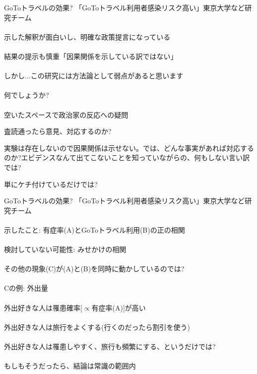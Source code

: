\begin{frame}[t]{GoToトラベルの効果?}
「GoToトラベル利用者感染リスク高い」東京大学など研究チーム\\~\\
示した解釈が面白いし、明確な政策提言になっている\\~\\
結果の提示も慎重「因果関係を示している訳ではない」\\~\\
\pause
しかし...\pause この研究には方法論として弱点があると思います\\~\\
\pause
何でしょうか?\\~\\

\pause
空いたスペースで政治家の反応への疑問
\begin{dinglist}{43}
\vspace{1.0ex}\setlength{\itemsep}{1.0ex}\setlength{\baselineskip}{12pt}
\pause
\item	査読通ったら意見、対応するのか?
\pause
\item	実験は存在しないので因果関係は示せない。では、どんな事実があれば対応するのか?エビデンスなんて出てこないことを知っていながらの、何もしない言い訳では?
\pause
\item	単にケチ付けているだけでは?
\end{dinglist}
\end{frame}

\begin{frame}[t]{GoToトラベルの効果?}
「GoToトラベル利用者感染リスク高い」東京大学など研究チーム\\~\\
示したこと: 有症率(A)とGoToトラベル利用(B)の正の相関\\~\\
\pause
検討していない可能性: みせかけの相関\\~\\
\pause
その他の現象(C)が(A)と(B)を同時に動かしているのでは?\\~\\
\pause
Cの例: 外出量\\~\\
\pause
外出好きな人は罹患確率[$\propto$有症率(A)]が高い\\~\\
\pause
外出好きな人は旅行をよくする(行くのだったら割引を使う)\\~\\
\pause
外出好きな人は罹患しやすく、旅行も頻繁にする、というだけでは?\\~\\
\pause
もしもそうだったら、結論は常識の範囲内
\end{frame}

